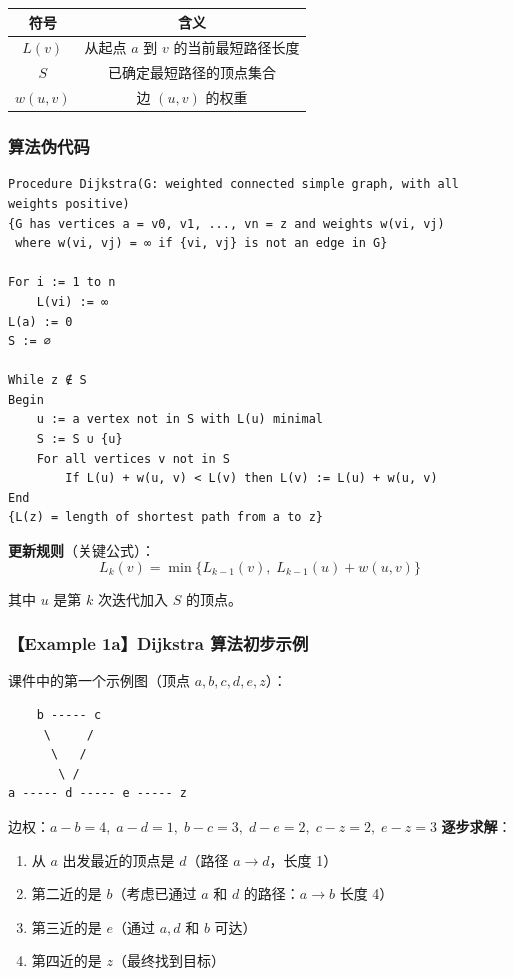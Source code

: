 \documentclass[10pt,a4paper,openany]{ctexbook}
\theoremstyle{definition}
\theoremstyle{remark}
\begin{document}
\begin{center}
\begin{tabular}{cc}
\hline
符号 & 含义 \\ \hline
$L(v)$ & 从起点 $a$ 到 $v$ 的当前最短路径长度 \\
$S$ & 已确定最短路径的顶点集合 \\
$w(u, v)$ & 边 $(u, v)$ 的权重 \\
\hline
\end{tabular}

\end{center}

\subsubsection{算法伪代码}

{\footnotesize\begin{verbatim}
Procedure Dijkstra(G: weighted connected simple graph, with all weights positive)
{G has vertices a = v0, v1, ..., vn = z and weights w(vi, vj)
 where w(vi, vj) = ∞ if {vi, vj} is not an edge in G}

For i := 1 to n
    L(vi) := ∞
L(a) := 0
S := ∅

While z ∉ S
Begin
    u := a vertex not in S with L(u) minimal
    S := S ∪ {u}
    For all vertices v not in S
        If L(u) + w(u, v) < L(v) then L(v) := L(u) + w(u, v)
End
{L(z) = length of shortest path from a to z}
\end{verbatim}}

\textbf{更新规则}（关键公式）：
\[
L_k(v) = \min\{L_{k-1}(v),\; L_{k-1}(u) + w(u, v)\}
\]

其中 $u$ 是第 $k$ 次迭代加入 $S$ 的顶点。
\subsubsection{【Example 1a】Dijkstra 算法初步示例}

课件中的第一个示例图（顶点 $a, b, c, d, e, z$）：
{\footnotesize\begin{verbatim}
    b ----- c
     \     /
      \   /
       \ /
a ----- d ----- e ----- z
\end{verbatim}}

边权：$a-b=4,\; a-d=1,\; b-c=3,\; d-e=2,\; c-z=2,\; e-z=3$
\textbf{逐步求解}：
\begin{enumerate}
\item 从 $a$ 出发最近的顶点是 $d$（路径 $a\to d$，长度 1）
\item 第二近的是 $b$（考虑已通过 $a$ 和 $d$ 的路径：$a\to b$ 长度 4）
\item 第三近的是 $e$（通过 $a,d$ 和 $b$ 可达）
\item 第四近的是 $z$（最终找到目标）

\end{enumerate}
\end{document}
